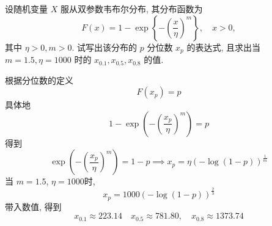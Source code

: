 \documentclass[../main.tex]{subfiles}
\begin{document}
\begin{exercise}{}{}
设随机变量 $X$ 服从双参数韦布尔分布, 其分布函数为
\[
F(x) = 1 - \exp\left\{-\left(\frac{x}{\eta}\right)^m\right\}, \quad x > 0,
\]
其中 $\eta>0, m>0$. 试写出该分布的 $p$ 分位数 $x_p$ 的表达式, 且求出当 $m=1.5, \eta=1000$ 时的 $x_{0.1}, x_{0.5}, x_{0.8}$ 的值.
\end{exercise}
\begin{solution}
     根据分位数的定义 \[
    F\left( x_{p}\right)= p 
    \]具体地 \[
    1-\exp \left( - \left( \frac{x_{p} }{\eta  }  \right)^{m}  \right) = p
    \]得到 \[
    \exp \left( -\left( \frac{x_{p} }{\eta  }  \right)^{m}  \right)= 1-p \implies  x_{p}=  \eta  \left(- \log\left( 1-p \right)  \right)^{\frac{1 }{m } }    
    \]当 \(  m= 1.5  \), \(  \eta = 1000  \)时,  \[
    x_{p}= 1000\left( -\log\left( 1-p \right)  \right)^{\frac{2 }{3 } } 
    \]  带入数值, 得到 \[
    x_{0.1}\approx 223.14 \quad x_{0.5} \approx 781.80, \quad x_{0.8} \approx  1373.74
    \]
\end{solution}
\end{document}
